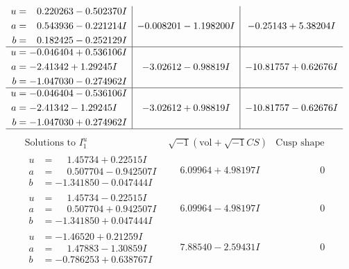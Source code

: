 \documentclass[1p]{elsarticle_modified}
\theoremstyle{definition}
\newcommand{\I}{\sqrt{-1}}
\begin{document}
$$\begin{array}{c|c|c}
\begin{aligned}
u &= \phantom{-}0.220263 - 0.502370 I \\
a &= \phantom{-}0.543936 - 0.221214 I \\
b &= \phantom{-}0.182425 - 0.252129 I\end{aligned}
 & -0.008201 - 1.198200 I & -0.25143 + 5.38204 I \\ \hline\begin{aligned}
u &= -0.046404 + 0.536106 I \\
a &= -2.41342 + 1.29245 I \\
b &= -1.047030 - 0.274962 I\end{aligned}
 & -3.02612 - 0.98819 I & -10.81757 + 0.62676 I \\ \hline\begin{aligned}
u &= -0.046404 - 0.536106 I \\
a &= -2.41342 - 1.29245 I \\
b &= -1.047030 + 0.274962 I\end{aligned}
 & -3.02612 + 0.98819 I & -10.81757 - 0.62676 I\\
 \hline 
 \end{array}$$\newpage$$\begin{array}{c|c|c}  
\text{Solutions to }I^u_{1}& \I (\text{vol} + \sqrt{-1}CS) & \text{Cusp shape}\\
 \hline 
\begin{aligned}
u &= \phantom{-}1.45734 + 0.22515 I \\
a &= \phantom{-}0.507704 - 0.942507 I \\
b &= -1.341850 - 0.047444 I\end{aligned}
 & \phantom{-}6.09964 + 4.98197 I & \phantom{-0.000000 } 0 \\ \hline\begin{aligned}
u &= \phantom{-}1.45734 - 0.22515 I \\
a &= \phantom{-}0.507704 + 0.942507 I \\
b &= -1.341850 + 0.047444 I\end{aligned}
 & \phantom{-}6.09964 - 4.98197 I & \phantom{-0.000000 } 0 \\ \hline\begin{aligned}
u &= -1.46520 + 0.21259 I \\
a &= \phantom{-}1.47883 - 1.30859 I \\
b &= -0.786253 + 0.638767 I\end{aligned}
 & \phantom{-}7.88540 - 2.59431 I & \phantom{-0.000000 } 0 \\ \hline\begin{aligned}

\end{aligned}
\end{array}$$
\end{document}

